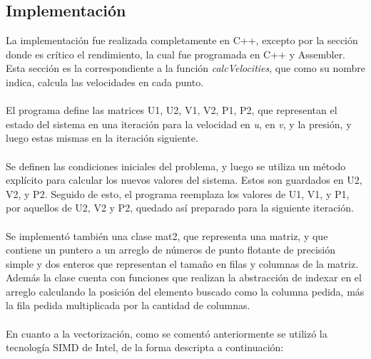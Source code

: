 \subsection{Implementación}
La implementación fue realizada completamente en C++, excepto por la sección donde es crítico el rendimiento, la cual fue programada en C++ y Assembler. Esta sección es la correspondiente a la función \textit{calcVelocities}, que como su nombre indica, calcula las velocidades en cada punto.
~\\
~\\
El programa define las matrices U1, U2, V1, V2, P1, P2, que representan el estado del sistema en una iteración para la velocidad en \textit{u}, en \textit{v}, y la presión, y luego estas mismas en la iteración siguiente. 
~\\
~\\
Se definen las condiciones iniciales del problema, y luego se utiliza un método explícito para calcular los nuevos valores del sistema. Estos son guardados en U2, V2, y P2. Seguido de esto, el programa reemplaza los valores de U1, V1, y P1, por aquellos de U2, V2 y P2, quedado así preparado para la siguiente iteración. 
~\\
~\\
Se implementó también una clase mat2, que representa una matriz, y que contiene un puntero a un arreglo de números de punto flotante de precisión simple y dos enteros que representan el tamaño en filas y columnas de la matriz. Además la clase cuenta con funciones que realizan la abstracción de indexar en el arreglo calculando la posición del elemento buscado como la columna pedida, más la fila pedida multiplicada por la cantidad de columnas. 
~\\
~\\
En cuanto a la vectorización, como se comentó anteriormente se utilizó la tecnología SIMD de Intel, de la forma descripta a continuación:
